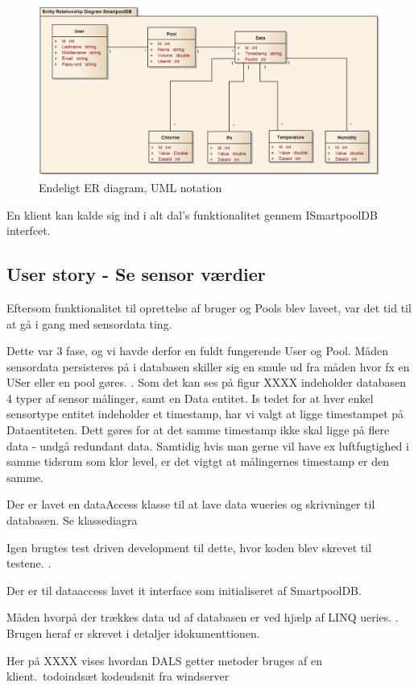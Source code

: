 \begin{figure}[h]
	\centering
	\includegraphics[width=\linewidth]{figs/design/databaseERD_final_uml}
	\caption{Endeligt ER diagram, UML notation}
	\label{fig:databaseERD_final_uml}
\end{figure}

En klient kan kalde sig ind i alt dal's funktionalitet gennem ISmartpoolDB interfcet.



\subsection{User story - Se sensor værdier}

Eftersom funktionalitet til oprettelse af bruger og Pools blev laveet, var  det tid til at gå i gang med sensordata ting.

Dette var 3 fase, og vi havde derfor en fuldt fungerende User og Pool. Måden sensordata persisteres på i databasen skiller sig en smule ud fra måden hvor fx en USer eller en pool gøres. . Som det kan ses på figur XXXX indeholder databasen 4 typer af sensor målinger, samt en Data entitet. Is tedet for at hver enkel sensortype entitet indeholder et timestamp, har vi valgt at ligge timestampet på Dataentiteten. Dett gøres for at det samme timestamp ikke skal ligge på flere data - undgå redundant data.  Samtidig hvis man gerne vil have ex luftfugtighed i samme tidsrum som klor level, er det vigtgt at målingernes timestamp er den samme.

Der er lavet en dataAccess klasse til at lave data wueries og skrivninger til databasen. Se klassediagra 

Igen brugtes test driven development til dette, hvor koden blev skrevet til testene.  .

Der er til dataaccess lavet it interface som initialiseret af SmartpoolDB.

Måden hvorpå der trækkes data ud af databasen er ved hjælp af LINQ ueries. . Brugen heraf er skrevet i detaljer idokumenttionen.

Her på XXXX vises hvordan DALS getter metoder bruges af en klient.\ todo{indsæt kodeudsnit fra windserver}